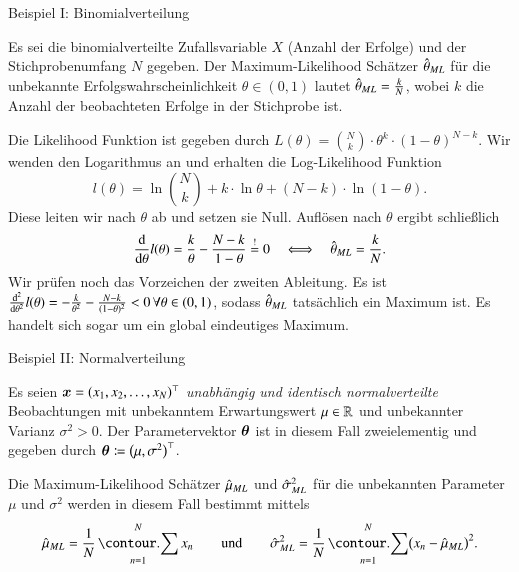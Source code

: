 \begin{frame}{Beispiel I: Binomialverteilung}{}
	\begin{mytheo}
		Es sei die binomialverteilte Zufallsvariable $X$ (Anzahl der Erfolge) und der Stichprobenumfang $N$ gegeben.
		Der Maximum-Likelihood Schätzer $\hat{\theta}_{ML}$ für die unbekannte Erfolgswahrscheinlichkeit $\theta \in (0, 1)$ lautet
		$\hat{\theta}_{ML} = \frac{k}{N}$, wobei $k$ die Anzahl der beobachteten Erfolge in der Stichprobe ist.
	\end{mytheo}
	
	\begin{myproof}
		Die Likelihood Funktion ist gegeben durch $L(\theta) = {N \choose k} \cdot \theta^k \cdot (1 - \theta)^{N - k}$.
		Wir wenden den Logarithmus an und erhalten die Log-Likelihood Funktion
		\begin{equation*}
			l(\theta) = \ln{N \choose k} + k \cdot \ln \theta + (N - k) \cdot \ln(1 - \theta).
		\end{equation*}
		Diese leiten wir nach $\theta$ ab und setzen sie Null. Auflösen nach $\theta$ ergibt schließlich
		\begin{equation*}
			\frac{\text{d}}{\text{d} \theta} l(\theta)
				= \frac{k}{\theta} - \frac{N - k}{1 - \theta}
				\overset{!}{=} 0
		\quad\Longleftrightarrow\quad
			\hat{\theta}_{ML}
				= \frac{k}{N}.
		\end{equation*}
		Wir prüfen noch das Vorzeichen der zweiten Ableitung. Es ist
		$\frac{\text{d}^2}{\text{d} \theta^2} l(\theta) = -\frac{k}{\theta^2} - \frac{N - k}{(1 - \theta)^2} < 0\,\forall \theta \in (0, 1)$,
		sodass $\hat{\theta}_{ML}$ tatsächlich ein Maximum ist. Es handelt sich sogar um ein global eindeutiges Maximum.
	\end{myproof}
\end{frame}


\begin{frame}{Beispiel II: Normalverteilung}{}
	\begin{mytheo}
		Es seien $\bm{x} = (x_1, x_2, \ldots, x_N)^\top$ \textit{unabhängig und identisch normalverteilte} Beobachtungen
		mit unbekanntem Erwartungswert $\mu \in \mathbb{R}$ und unbekannter Varianz $\sigma^2 > 0$.
		Der Parametervektor $\bm{\theta}$ ist in diesem Fall zweielementig und gegeben durch
		$\bm{\theta} \coloneqq \bigl( \mu, \sigma^2 \bigr)^\top$.
		
		Die Maximum-Likelihood Schätzer $\hat{\mu}_{ML}$ und $\hat{\sigma}^2_{ML}$ für die unbekannten Parameter
		$\mu$ und $\sigma^2$ werden in diesem Fall bestimmt mittels
		\begin{equation*}
			\muML
				= \frac{1}{N} \sum_{n=1}^N x_n
		\qquad\text{und}\qquad
			\sigmasquML
				= \frac{1}{N} \sum_{n=1}^N \bigl( x_n - \muML \bigr)^2.
		\end{equation*}
	\end{mytheo}
\end{frame}


